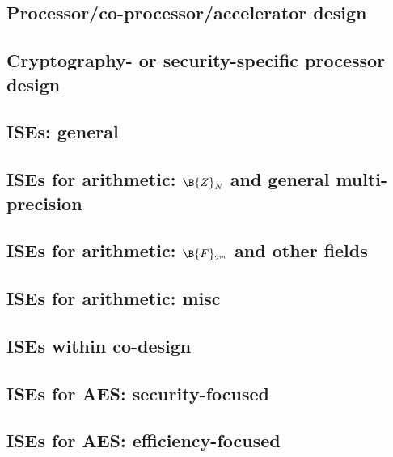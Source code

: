 
\subsection*{Processor/co-processor/accelerator design}
\cite{SCARV:Gutmann:00}
\cite{SCARV:WuWeaAus:01}
\cite{SCARV:TheSisPne:09}
\cite{SCARV:MTRGS:99}
\cite{SCARV:GGHJPTW:11}

\subsection*{Cryptography- or security-specific processor design}
\cite{SCARV:KocSavGro:08,SCARV:TilKirSze:10,SCARV:NREAMM:12,SCARV:YumSav:15,SCARV:RagAmbPar:15,SCARV:AweAus:17,SCARV:YHEF:18}

\subsection*{ISEs: general}
\cite{SCARV:BarGioMar:09}
\cite{SCARV:RegIen:16}
\cite{SCARV:FazLopOli:18}

\subsection*{ISEs for arithmetic: $\B{Z}_{N}$ and general multi-precision}
\cite{SCARV:Gro:02,SCARV:GroKam:03:a,SCARV:GAST:05,SCARV:GroTilSze:07}
\subsection*{ISEs for arithmetic: $\B{F}_{2^m}$ and other fields}
\cite{SCARV:GroKam:03:b,SCARV:FisLee:04,SCARV:GKP:04}
\subsection*{ISEs for arithmetic: misc}
\cite{SCARV:GroSav:04}

\subsection*{ISEs within co-design}
\cite{SCARV:KLWGSTW:06,SCARV:GIPTV:06}

\subsection*{ISEs for AES: security-focused}
\cite{SCARV:TilGro:07:a}
\subsection*{ISEs for AES: efficiency-focused}
\cite{SCARV:TilGroSze:05,SCARV:TilGro:06,SCARV:APRJ:11}
